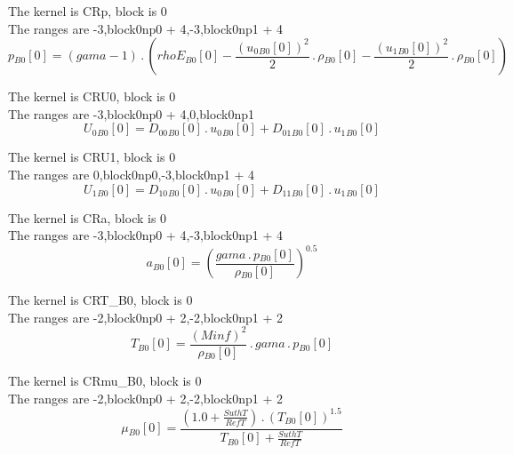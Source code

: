 \documentclass{article}
\begin{document}
\noindent The kernel is CRp, block is 0\\\noindent The ranges are -3,block0np0 + 4,-3,block0np1 + 4\\\begin{dmath}{p{_{B0}}}[{0}] = \left(gama - 1\right) \,.\, \left({rhoE{_{B0}}}[{0}] - \frac{\left({u_{0}{_{B0}}}[{0}] \right)^{2}}{2} \,.\, {\rho{_{B0}}}[{0}] - \frac{\left({u_{1}{_{B0}}}[{0}] \right)^{2}}{2} \,.\, 
{\rho{_{B0}}}[{0}]\right)\end{dmath}

\noindent The kernel is CRU0, block is 0\\\noindent The ranges are -3,block0np0 + 4,0,block0np1\\\begin{dmath}{U_{0}{_{B0}}}[{0}] = {D_{00}{_{B0}}}[{0}] \,.\, {u_{0}{_{B0}}}[{0}] + {D_{01}{_{B0}}}[{0}] \,.\, {u_{1}{_{B0}}}[{0}]\end{dmath}

\noindent The kernel is CRU1, block is 0\\\noindent The ranges are 0,block0np0,-3,block0np1 + 4\\\begin{dmath}{U_{1}{_{B0}}}[{0}] = {D_{10}{_{B0}}}[{0}] \,.\, {u_{0}{_{B0}}}[{0}] + {D_{11}{_{B0}}}[{0}] \,.\, {u_{1}{_{B0}}}[{0}]\end{dmath}

\noindent The kernel is CRa, block is 0\\\noindent The ranges are -3,block0np0 + 4,-3,block0np1 + 4\\\begin{dmath}{a{_{B0}}}[{0}] = \left(\frac{gama \,.\, {p{_{B0}}}[{0}]}{{\rho{_{B0}}}[{0}]} \right)^{0.5}\end{dmath}

\noindent The kernel is CRT_B0, block is 0\\\noindent The ranges are -2,block0np0 + 2,-2,block0np1 + 2\\\begin{dmath}{T{_{B0}}}[{0}] = \frac{\left(Minf \right)^{2}}{{\rho{_{B0}}}[{0}]} \,.\, gama \,.\, {p{_{B0}}}[{0}]\end{dmath}

\noindent The kernel is CRmu_B0, block is 0\\\noindent The ranges are -2,block0np0 + 2,-2,block0np1 + 2\\\begin{dmath}{\mu{_{B0}}}[{0}] = \frac{\left(1.0 + \frac{SuthT}{RefT}\right) \,.\, \left({T{_{B0}}}[{0}] \right)^{1.5}}{{T{_{B0}}}[{0}] + \frac{SuthT}{RefT}}\end{dmath}
\end{document}
